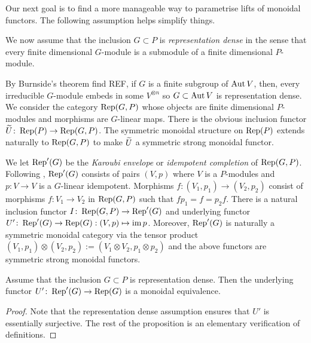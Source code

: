 \documentclass[12pt]{amsart}
\begin{document}
Our next goal is to find a more manageable way to parametrise lifts of monoidal functors. The following assumption helps simplify things.
\begin{assumption}  \label{ass:issummand}
We now assume that the inclusion $G \subset P$ is {\em representation dense} in the sense that every finite dimensional $G$-module is a submodule of a finite dimensional $P$-module.
\end{assumption}
By Burnside's theorem {\red find REF}, if $G$ is a finite subgroup of $\operatorname{Aut} V$, then, every irreducible $G$-module embeds in some $V^{\otimes n}$ so $G \subset \operatorname{Aut} V$ is representation dense. 
We consider the category $\operatorname{Rep}(G,P)$ whose objects are finite dimensional $P$-modules and morphisms are $G$-linear maps. There is the obvious inclusion functor ${\widetilde{U}} \colon \operatorname{Rep}(P) \to \operatorname{Rep}(G,P)$. The symmetric monoidal structure on $\operatorname{Rep}(P)$ extends naturally to $\operatorname{Rep}(G,P)$ to make ${\widetilde{U}}$ a symmetric strong monoidal functor. 

We let $\operatorname{Rep}'(G)$ be the {\em Karoubi envelope} or {\em idempotent completion} of $\operatorname{Rep}(G,P)$. Following \cite{BNM}, $\operatorname{Rep}'(G)$ consists of pairs $(V,p)$ where $V$ is a $P$-modules and $p \colon V \to V$ is a $G$-linear idempotent. Morphisms $f \colon (V_1,p_1) \to (V_2,p_2)$ consist of morphisms $f \colon V_1 \to V_2$ in $\operatorname{Rep}(G,P)$ such that $fp_1 = f = p_2f$. There is a natural inclusion functor $I \colon \operatorname{Rep}(G,P) \to \operatorname{Rep}'(G)$ and underlying functor $U' \colon \operatorname{Rep}'(G) \to \operatorname{Rep}(G): (V,p) \mapsto \textup{im}\, p$. Moreover, $\operatorname{Rep}'(G)$ is naturally a symmetric monoidal category via the tensor product $(V_1,p_1) \otimes (V_2,p_2) := (V_1 \otimes V_2, p_1 \otimes p_2)$ and the above functors are symmetric strong monoidal functors. 

\begin{proposition}  \label{prop:Repprime}
Assume that the inclusion $G \subset P$ is representation dense. Then the  underlying functor $U' \colon \operatorname{Rep}'(G) \to \operatorname{Rep}(G)$ is a monoidal equivalence. 
\end{proposition}
\begin{proof}
Note that the representation dense assumption ensures that $U'$ is essentially surjective. The rest of the proposition is an elementary verification of definitions. 
\end{proof}
\end{document}
